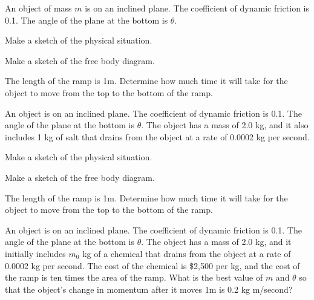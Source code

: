 
\begin{problem}
\item An object of mass $m$ is on an inclined plane. The coefficient
  of dynamic friction is 0.1. The angle of the plane at the bottom is
  $\theta$.
  \begin{subproblem}
  \item Make a sketch of the physical situation.
    \vfill
  \item Make a sketch of the free body diagram.
    \vfill
  \item The length of the ramp is 1m. Determine how much time it will
    take for the object to move from the top to the bottom of the
    ramp.
    \vfill
  \end{subproblem}
\end{problem}


\begin{problem}
\item An object is on an inclined plane. The coefficient of dynamic
  friction is 0.1. The angle of the plane at the bottom is
  $\theta$. The object has a mass of 2.0 kg, and it also includes 1 kg
  of salt that drains from the object at a rate of 0.0002 kg per
  second.
  \begin{subproblem}
  \item Make a sketch of the physical situation.  
    \vfill
  \item Make a sketch of the free body diagram.
    \vfill
    \clearpage
  \item The length of the ramp is 1m. Determine how much time it will
    take for the object to move from the top to the bottom of the
    ramp.  
    \vfill
  \end{subproblem}
\end{problem}

\begin{problem}
\item An object is on an inclined plane. The coefficient of dynamic
  friction is 0.1. The angle of the plane at the bottom is
  $\theta$. The object has a mass of 2.0 kg, and it initially includes
  $m_0$ kg of a chemical that drains from the object at a rate of
  0.0002 kg per second. The cost of the chemical is \$2,500 per kg,
  and the cost of the ramp is ten times the area of the ramp. What is
  the best value of $m$ and $\theta$ so that the object's change in
  momentum after it moves 1m is 0.2 kg m/second?

  \vfill

\end{problem}


